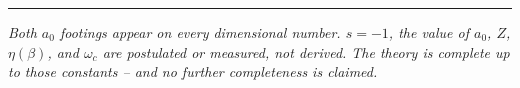 \documentclass[
]{article}
\begin{document}
\begin{center}\rule{0.5\linewidth}{0.5pt}\end{center}

\emph{Both \(a_0\) footings appear on every dimensional number.
\(s = -1\), the value of \(a_0\), \(Z\), \(\eta(\beta)\), and
\(\omega_c\) are postulated or measured, not derived. The theory is
complete up to those constants -- and no further completeness is
claimed.}
\end{document}
